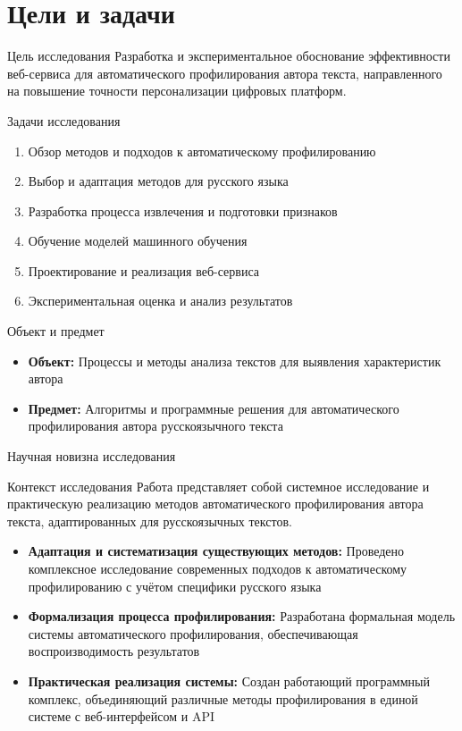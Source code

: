 \documentclass[10pt]{beamer}
\begin{document}
\section{Цели и задачи}
\begin{frame}{Цель исследования}
Разработка и экспериментальное обоснование эффективности веб-сервиса для автоматического профилирования автора текста, направленного на повышение точности персонализации цифровых платформ.
\end{frame}

\begin{frame}{Задачи исследования}
\begin{enumerate}
\item Обзор методов и подходов к автоматическому профилированию
\item Выбор и адаптация методов для русского языка
\item Разработка процесса извлечения и подготовки признаков
\item Обучение моделей машинного обучения
\item Проектирование и реализация веб-сервиса
\item Экспериментальная оценка и анализ результатов
\end{enumerate}
\end{frame}

\begin{frame}{Объект и предмет}
\begin{itemize}
\item \textbf{Объект:} Процессы и методы анализа текстов для выявления характеристик автора
\item \textbf{Предмет:} Алгоритмы и программные решения для автоматического профилирования автора русскоязычного текста
\end{itemize}
\end{frame}

\begin{frame}{Научная новизна исследования}
\begin{block}{Контекст исследования}
Работа представляет собой системное исследование и практическую реализацию методов автоматического профилирования автора текста, адаптированных для русскоязычных текстов.
\end{block}

\begin{itemize}
\item \textbf{Адаптация и систематизация существующих методов:} Проведено комплексное исследование современных подходов к автоматическому профилированию с учётом специфики русского языка

\item \textbf{Формализация процесса профилирования:} Разработана формальная модель системы автоматического профилирования, обеспечивающая воспроизводимость результатов

\item \textbf{Практическая реализация системы:} Создан работающий программный комплекс, объединяющий различные методы профилирования в единой системе с веб-интерфейсом и API
\end{itemize}
\end{frame}
\end{document}
